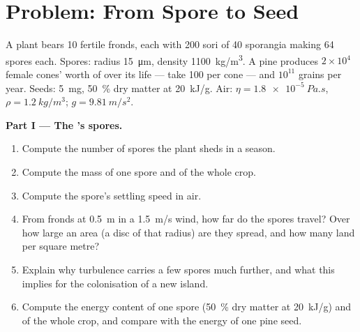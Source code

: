 \section{Problem: From Spore to Seed}

\begin{problem}
\label{pb:b2:plant-life-cycles:1}
A  plant bears \num{10} fertile fronds, each with \num{200}
sori of \num{40} sporangia making \num{64} spores each. Spores:
radius \qty{15}{\micro m}, density \qty{1100}{kg/m^3}. A pine
produces $2\times 10^{4}$ female cones' worth of  over its
life --- take \num{100}  per cone --- and $10^{11}$ 
grains per year. Seeds: \qty{5}{mg}, \qty{50}{\%} dry matter at
\qty{20}{kJ/g}. Air: $\eta = \qty{1.8e-5}{Pa.s}$, $\rho =
\qty{1.2}{kg/m^3}$; $g = \qty{9.81}{m/s^2}$.

\medskip
\noindent\textbf{Part I --- The 's spores.}
\begin{enumerate}
  \item Compute the number of spores the plant sheds in a season.
  \item Compute the mass of one spore and of the whole crop.
  \item Compute the spore's settling speed in air.
  \item From fronds at \qty{0.5}{m} in a \qty{1.5}{m/s} wind, how far
        do the spores travel? Over how large an area (a disc of that
        radius) are they spread, and how many land per square metre?
  \item Explain why turbulence carries a few spores much further,
        and what this implies for the colonisation of a new island.
  \item Compute the energy content of one spore (\qty{50}{\%} dry
        matter at \qty{20}{kJ/g}) and of the whole crop, and compare
        with the energy of one pine seed.
\end{enumerate}


\end{problem}
